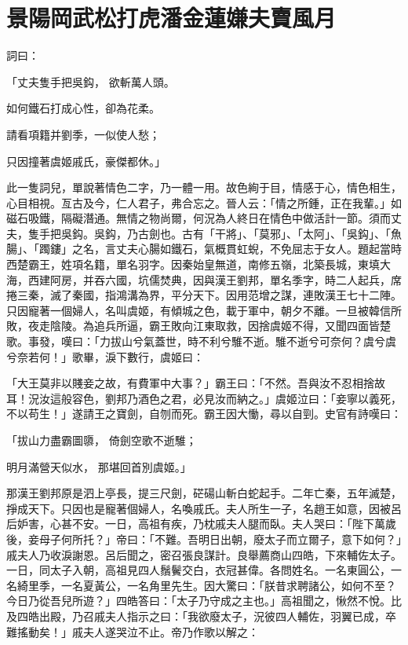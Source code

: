 %

\chapter{景陽岡武松打虎\KG 潘金蓮嫌夫賣風月}

\begin{showcontents}{}



詞曰：

「丈夫隻手把吳鈎，
欲斬萬人頭。

如何鐵石打成心性，卻為花柔。

請看項籍并劉季，一似使人愁；

只因撞著虞姬戚氏，豪傑都休。」

此一隻詞兒，單說著情色二字，乃一體一用。故色絢于目，情感于心，情色相生，心目相視。亙古及今，仁人君子，弗合忘之。晉人云：「情之所鍾，正在我輩。」如磁石吸鐵，隔礙潛通。無情之物尚爾，何況為人終日在情色中做活計一節。須而丈夫，隻手把吳鈎。吳鈎，乃古劍也。古有「干將」、「莫邪」、「太阿」、「吳鈎」、「魚腸」、「躅鏤」之名，言丈夫心腸如鐵石，氣概貫虹蜺，不免屈志于女人。題起當時西楚霸王，姓項名籍，單名羽字。因秦始皇無道，南修五嶺，北築長城，東填大海，西建阿房，并吞六國，坑儒焚典，因與漢王劉邦，單名季字，時二人起兵，席捲三秦，滅了秦國，指鴻溝為界，平分天下。因用范增之謀，連敗漢王七十二陣。只因寵著一個婦人，名叫虞姬，有傾城之色，載于軍中，朝夕不離。一旦被韓信所敗，夜走陰陵。為追兵所逼，霸王敗向江東取救，因捨虞姬不得，又聞四面皆楚歌。事發，嘆曰：「力拔山兮氣蓋世，時不利兮騅不逝。騅不逝兮可奈何？虞兮虞兮奈若何！」歌畢，淚下數行，虞姬曰：

「大王莫非以賤妾之故，有費軍中大事？」霸王曰：「不然。吾與汝不忍相捨故耳！況汝這般容色，劉邦乃酒色之君，必見汝而納之。」虞姬泣曰：「妾寧以義死，不以苟生！」遂請王之寶劍，自刎而死。霸王因大慟，尋以自剄。史官有詩嘆曰：

「拔山力盡霸圖隳，  倚劍空歌不逝騅；

明月滿營天似水，  那堪回首別虞姬。」

那漢王劉邦原是泗上亭長，提三尺劍，硭碭山斬白蛇起手。二年亡秦，五年滅楚，掙成天下。只因也是寵著個婦人，名喚戚氏。夫人所生一子，名趙王如意，因被呂后妒害，心甚不安。一日，高祖有疾，乃枕戚夫人腿而臥。夫人哭曰：「陛下萬歲後，妾母子何所托？」帝曰：「不難。吾明日出朝，廢太子而立爾子，意下如何？」戚夫人乃收淚謝恩。呂后聞之，密召張良謀計。良舉薦商山四皓，下來輔佐太子。一日，同太子入朝，高祖見四人鬚鬢交白，衣冠甚偉。各問姓名。一名東圓公，一名綺里季，一名夏黃公，一名角里先生。因大驚曰：「朕昔求聘諸公，如何不至？今日乃從吾兒所遊？」四皓答曰：「太子乃守成之主也。」高祖聞之，愀然不悅。比及四皓出殿，乃召戚夫人指示之曰：「我欲廢太子，況彼四人輔佐，羽翼已成，卒難搖動矣！」戚夫人遂哭泣不止。帝乃作歌以解之：


\end{showcontents}
